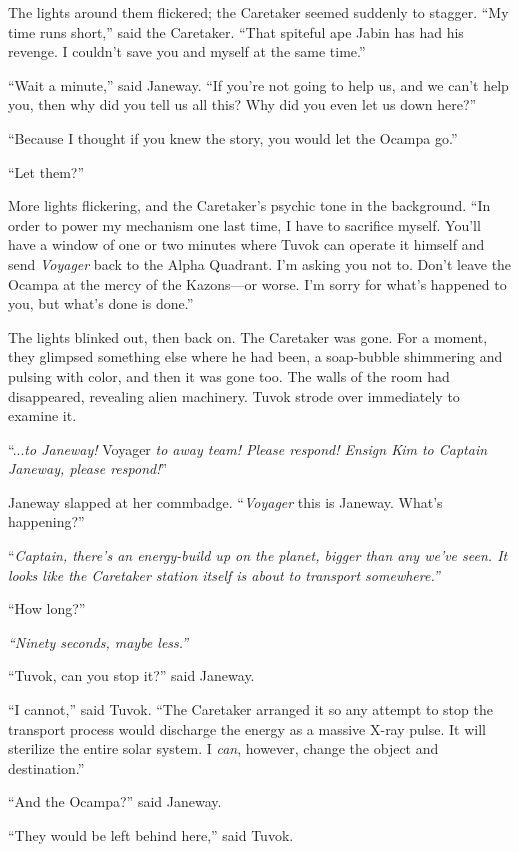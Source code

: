 \documentclass[twoside,letterpaper,12pt]{memoir}
\begin{document}
The lights around them flickered; the Caretaker seemed suddenly to stagger. ``My time runs short,” said the Caretaker. ``That spiteful ape Jabin has had his revenge. I couldn’t save you and myself at the same time.” 

``Wait a minute,” said Janeway. ``If you’re not going to help us, and we can’t help you, then why did you tell us all this? Why did you even let us down here?” 

``Because I thought if you knew the story, you would let the Ocampa go.” 

``Let them?” 

More lights flickering, and the Caretaker’s psychic tone in the background. ``In order to power my mechanism one last time, I have to sacrifice myself. You’ll have a window of one or two minutes where Tuvok can operate it himself and send \textit{Voyager} back to the Alpha Quadrant. I’m asking you not to. Don’t leave the Ocampa at the mercy of the Kazons---or worse. I’m sorry for what’s happened to you, but what’s done is done.” 

The lights blinked out, then back on. The Caretaker was gone. For a moment, they glimpsed something else where he had been, a soap-bubble shimmering and pulsing with color, and then it was gone too. The walls of the room had disappeared, revealing alien machinery. Tuvok strode over immediately to examine it. 

``...\textit{to Janeway! }Voyager \textit{to away team! Please respond! Ensign Kim to Captain Janeway, please respond!}” 

Janeway slapped at her commbadge. ``\textit{Voyager }this is Janeway. What’s happening?” 

``\textit{Captain, there’s an energy-build up on the planet, bigger than any we’ve seen. It looks like the Caretaker station itself is about to transport somewhere.”} 

``How long?” 

\textit{``Ninety seconds, maybe less.”} 

``Tuvok, can you stop it?” said Janeway. 

``I cannot,” said Tuvok. ``The Caretaker arranged it so any attempt to stop the transport process would discharge the energy as a massive X-ray pulse. It will sterilize the entire solar system. I \textit{can}, however, change the object and destination.” 

``And the Ocampa?” said Janeway. 

``They would be left behind here,” said Tuvok. 
\end{document}

